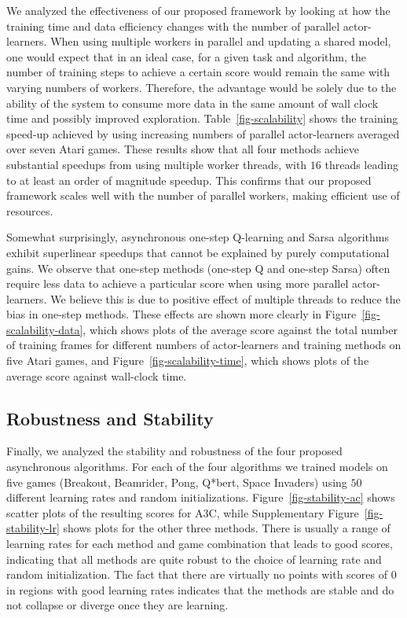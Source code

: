 \documentclass{article} %
\begin{document}
%
We analyzed the effectiveness of our proposed framework by looking at how the training time and data efficiency changes with the number of parallel actor-learners.
When using multiple workers in parallel and updating a shared model, one would expect that in an ideal case, for a given task and algorithm, the number of training steps to achieve a certain score would remain the same with varying numbers of workers.
Therefore, the advantage would be solely due to the ability of the system to consume more data in the same amount of wall clock time and possibly improved exploration.
Table~\ref{fig-scalability} shows the training speed-up achieved by using increasing numbers of parallel actor-learners averaged over seven Atari games.
These results show that all four methods achieve substantial speedups from using multiple worker threads, with $16$ threads leading to at least an order of magnitude speedup.
This confirms that our proposed framework scales well with the number of parallel workers, making efficient use of resources.

%
%
%
%
%
%
%
%
%
%
%
%
%
%
%
%
%
%

%
%
%
%
%
%


Somewhat surprisingly, asynchronous one-step Q-learning and Sarsa algorithms exhibit superlinear speedups that cannot be explained by purely computational gains.
We observe that one-step methods (one-step Q and one-step Sarsa) often require less data to achieve a particular score when using more parallel actor-learners.
We believe this is due to positive effect of multiple threads to reduce the bias in one-step methods.
These effects are shown more clearly in Figure~\ref{fig-scalability-data}, which shows plots of the average score against the total number of training frames for different numbers of actor-learners and training methods on five Atari games, and Figure~\ref{fig-scalability-time}, which shows plots of the average score against wall-clock time.
%
%
%
%
%

\subsection{Robustness and Stability}
Finally, we analyzed the stability and robustness of the four proposed asynchronous algorithms.
For each of the four algorithms we trained models on five games (Breakout, Beamrider, Pong, Q*bert, Space Invaders) using $50$ different learning rates and random initializations.
Figure~\ref{fig-stability-ac} shows scatter plots of the resulting scores for A3C, while Supplementary Figure~\ref{fig-stability-lr} shows plots for the other three methods.
There is usually a range of learning rates for each method and game combination that leads to good scores, indicating that all methods are quite robust to the choice of learning rate and random initialization.
The fact that there are virtually no points with scores of $0$ in regions with good learning rates indicates that the methods are stable and do not collapse or diverge once they are learning.
%
%
%
\end{document}

